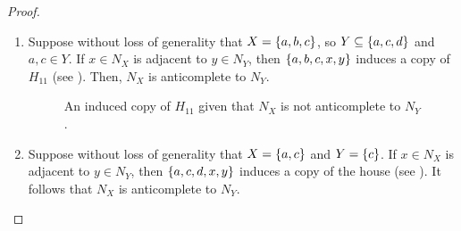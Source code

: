 \begin{proof}
    \leavevmode \par
    \begin{enumerate}[label=(\roman*)]
        \item Suppose without loss of generality that $X=\left\{a,b,c\right\}$, so
            $Y\subseteq \left\{a,c,d\right\}$ and $a,c\in Y$. If $x\in N_X$ is adjacent to
            $y\in N_Y$, then $\left\{a,b,c,x,y\right\}$ induces a copy of $H_{11}$ (see
            ). Then, $N_X$ is anticomplete to $N_Y$.

            \begin{figure}[htb!]
                \centering
                \caption{An induced copy of $H_{11}$ given that $N_X$ is not
                    anticomplete to $N_Y$.}
                \label{fig:anti_1}
            \end{figure}
        \item Suppose without loss of generality that $X=\left\{a,c\right\}$ and $Y=\left\{c\right\}$.
            If $x\in N_X$ is adjacent to $y\in N_Y$, then $\left\{a,c,d,x,y\right\}$
            induces a copy of the house (see ). It follows that
            $N_X$ is anticomplete to $N_Y$.

            \begin{figure}[htb!]
                \centering
\end{figure}
\end{enumerate}
\end{proof}
